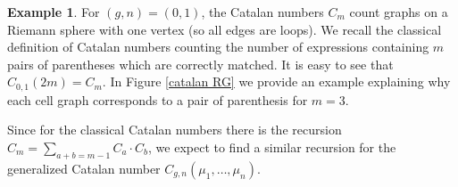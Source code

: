 \documentclass[oneside, 11pt]{amsart}
\theoremstyle{definition}
\newtheorem{ex}{Example}[section]
\numberwithin{equation}{subsection}
\begin{document}
\begin{figure}[h]
\centering
\subfloat[]{{\label{RG}\texttt{[image: 11]}}}%
%
\caption{}
\end{figure}

\begin{ex}\label{cat}
For $(g,n)=(0,1)$, the Catalan numbers 
$C_m$ count graphs on a Riemann sphere with one vertex (so all edges are loops). We recall the classical definition of Catalan numbers counting the number of expressions containing $m$ pairs of parentheses which are correctly matched.
It is easy to see that $C_{0,1}(2m)=C_m$. In Figure \eqref{catalan RG} we provide an example explaining why each cell graph corresponds to a pair of parenthesis for $m=3$.
\end{ex}

Since for the classical Catalan numbers there is the recursion $C_m=\sum_{a+b=m-1}C_a\cdot C_b$, we expect to find a similar recursion for the generalized Catalan number $C_{g,n}(\mu_1,\ldots, \mu_n)$.
\end{document}

